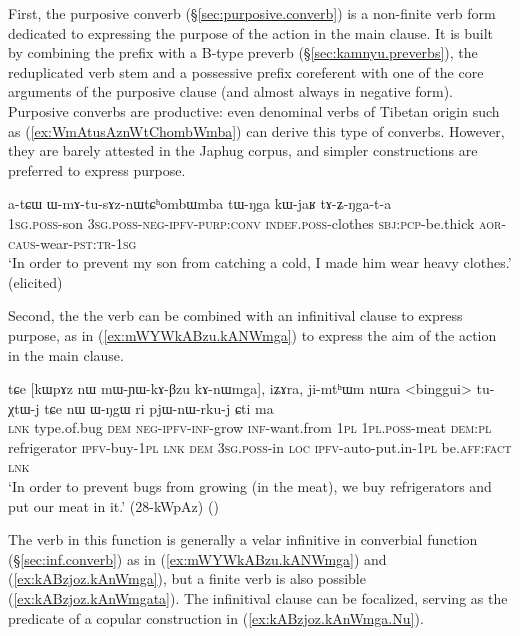 First, the purposive converb (§\ref{sec:purposive.converb}) is a non-finite verb form dedicated to expressing the purpose of the action in the main clause. It is built by combining the prefix  with a B-type preverb (§\ref{sec:kamnyu.preverbs}), the reduplicated verb stem and a possessive prefix coreferent with one of the core arguments of the purposive clause (and almost always in negative form). Purposive converbs are productive: even denominal verbs of Tibetan origin such as    (\ref{ex:WmAtusAznWtChombWmba}) can derive this type of converbs. However, they are barely attested in the Japhug corpus, and simpler constructions are preferred to express purpose.


\begin{exe}
\ex \label{ex:WmAtusAznWtChombWmba}
\gll  a-tɕɯ ɯ-mɤ-tu-sɤz-nɯtɕʰombɯ\redp{}mba tɯ-ŋga kɯ-jaʁ tɤ-ʑ-ŋga-t-a \\
\textsc{1sg}.\textsc{poss}-son \textsc{3sg}.\textsc{poss}-\textsc{neg}-\textsc{ipfv}-\textsc{purp}:\textsc{conv} \textsc{indef}.\textsc{poss}-clothes \textsc{sbj}:\textsc{pcp}-be.thick \textsc{aor}-\textsc{caus}-wear-\textsc{pst}:\textsc{tr}-\textsc{1sg} \\
\glt `In order to prevent my son from catching a cold, I made him wear heavy clothes.' (elicited)
\end{exe}

Second, the  the verb   can be combined with an infinitival clause to express purpose, as in (\ref{ex:mWYWkABzu.kANWmga}) to express the aim of the action in the main clause. 


\begin{exe}
\ex \label{ex:mWYWkABzu.kANWmga}
\gll tɕe [kɯpɤz nɯ mɯ-ɲɯ-kɤ-βzu kɤ-nɯmga], iʑɤra, ji-mtʰɯm nɯra <binggui> tu-χtɯ-j tɕe nɯ ɯ-ŋgɯ ri pjɯ-nɯ-rku-j ɕti ma \\
\textsc{lnk} type.of.bug \textsc{dem} \textsc{neg}-\textsc{ipfv}-\textsc{inf}-grow \textsc{inf}-want.from \textsc{1pl} \textsc{1pl}.\textsc{poss}-meat \textsc{dem}:\textsc{pl} refrigerator  \textsc{ipfv}-buy-\textsc{1pl} \textsc{lnk} \textsc{dem} \textsc{3sg}.\textsc{poss}-in \textsc{loc} \textsc{ipfv}-auto-put.in-\textsc{1pl} be.\textsc{aff}:\textsc{fact} \textsc{lnk} \\
\glt `In order to prevent  bugs from growing (in the meat), we buy refrigerators and put our meat in it.' (28-kWpAz)
()
\end{exe}

The verb  in this function is generally a velar infinitive   in converbial function (§\ref{sec:inf.converb}) as in (\ref{ex:mWYWkABzu.kANWmga}) and (\ref{ex:kABzjoz.kAnWmga}), but a finite verb is also possible (\ref{ex:kABzjoz.kAnWmgata}). The infinitival clause can be focalized, serving as the predicate of a copular construction in  (\ref{ex:kABzjoz.kAnWmga.Nu}).

